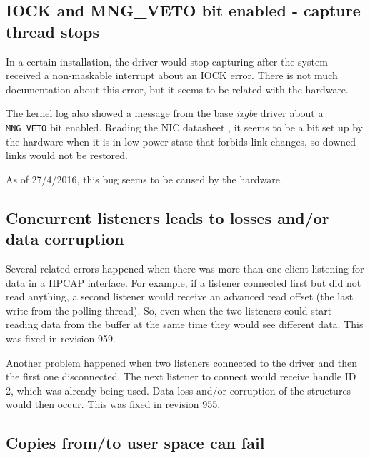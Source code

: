 \subsection{IOCK and MNG\_VETO bit enabled - capture thread stops}

\begin{bugdata}
\bugnotfixed
{}
\end{bugdata}

In a certain installation, the driver would stop capturing after the system received a non-maskable interrupt about an IOCK error. There is not much documentation about this error, but it seems to be related with the hardware.

The kernel log also showed a message from the base \textit{ixgbe} driver about a \texttt{MNG\_VETO} bit enabled. Reading the NIC datasheet \cite{825992010}, it seems to be a bit set up by the hardware when it is in low-power state that forbids link changes, so downed links would not be restored.

As of 27/4/2016, this bug seems to be caused by the hardware.

\subsection{Concurrent listeners leads to losses and/or data corruption}

\begin{bugdata}
\bugfixed[r959, r955]
\end{bugdata}

Several related errors happened when there was more than one client listening for data in a HPCAP interface. For example, if a listener connected first but did not read anything, a second listener would receive an advanced read offset (the last write from the polling thread). So, even when the two listeners could start reading data from the buffer at the same time they would see different data. This was fixed in revision 959.

Another problem happened when two listeners connected to the driver and then the first one disconnected. The next listener to connect would receive handle ID 2, which was already being used. Data loss and/or corruption of the structures would then occur. This was fixed in revision 955.

\subsection{Copies from/to user space can fail}

